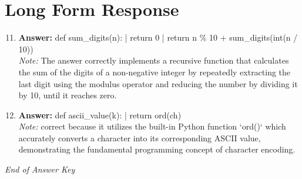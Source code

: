 \documentclass[12pt]{article}
\begin{document}
\section*{Long Form Response}
\begin{enumerate}[label=\arabic*.]
\setcounter{enumi}{10}
\item \textbf{Answer:} def sum\_digits(n): | return 0 | return n \% 10 + sum\_digits(int(n / 10))
\\ \textit{Note:} The answer correctly implements a recursive function that calculates the sum of the digits of a non-negative integer by repeatedly extracting the last digit using the modulus operator and reducing the number by dividing it by 10, until it reaches zero.
\item \textbf{Answer:} def ascii\_value(k): | return ord(ch)
\\ \textit{Note:} correct because it utilizes the built-in Python function `ord()` which accurately converts a character into its corresponding ASCII value, demonstrating the fundamental programming concept of character encoding.
\end{enumerate}

\vfill
\noindent\textit{End of Answer Key}
\end{document}
